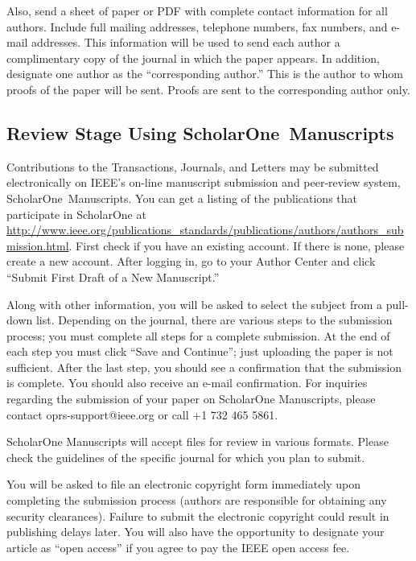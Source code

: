 \documentclass[journal,twoside,web]{ieeecolor}
\begin{document}
Also, send a sheet of paper or PDF with complete contact information for all 
authors. Include full mailing addresses, telephone numbers, fax numbers, and 
e-mail addresses. This information will be used to send each author a 
complimentary copy of the journal in which the paper appears. In addition, 
designate one author as the ``corresponding author.'' This is the author to 
whom proofs of the paper will be sent. Proofs are sent to the corresponding 
author only.

\subsection{Review Stage Using ScholarOne\textregistered\ Manuscripts}
Contributions to the Transactions, Journals, and Letters may be submitted 
electronically on IEEE's on-line manuscript submission and peer-review 
system, ScholarOne\textregistered\ Manuscripts. You can get a listing of the 
publications that participate in ScholarOne at 
\underline{http://www.ieee.org/publications\_standards/publications/}\discretionary{}{}{}\underline{authors/authors\_submission.html}.
First check if you have an existing account. If there is none, please create 
a new account. After logging in, go to your Author Center and click ``Submit 
First Draft of a New Manuscript.'' 

Along with other information, you will be asked to select the subject from a 
pull-down list. Depending on the journal, there are various steps to the 
submission process; you must complete all steps for a complete submission. 
At the end of each step you must click ``Save and Continue''; just uploading 
the paper is not sufficient. After the last step, you should see a 
confirmation that the submission is complete. You should also receive an 
e-mail confirmation. For inquiries regarding the submission of your paper on 
ScholarOne Manuscripts, please contact oprs-support@ieee.org or call +1 732 
465 5861.

ScholarOne Manuscripts will accept files for review in various formats. 
Please check the guidelines of the specific journal for which you plan to 
submit.

You will be asked to file an electronic copyright form immediately upon 
completing the submission process (authors are responsible for obtaining any 
security clearances). Failure to submit the electronic copyright could 
result in publishing delays later. You will also have the opportunity to 
designate your article as ``open access'' if you agree to pay the IEEE open 
access fee. 
\end{document}
